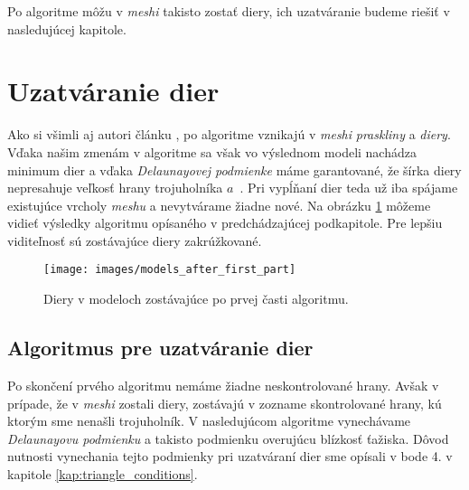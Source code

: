 \begin{enumerate}
    Po algoritme môžu v \textit{meshi} takisto zostať diery, ich uzatváranie budeme riešiť v nasledujúcej kapitole.
\end{enumerate}

\section{Uzatváranie dier}
\label{kap:second_part_of_algorithm}
Ako si všimli aj autori článku \cite{akkouche2001adaptive}, po algoritme vznikajú v \textit{meshi} 
\textit{praskliny} a \textit{diery}. Vďaka našim zmenám v algoritme sa však vo výslednom modeli nachádza minimum dier 
a vďaka \textit{Delaunayovej podmienke} máme garantované, že šírka diery nepresahuje veľkosť hrany trojuholníka
$a$~\cite{akkouche2001adaptive}. Pri vypĺňaní dier teda už iba spájame existujúce vrcholy \textit{meshu} a nevytvárame žiadne nové.
Na obrázku \ref{obr:models_after_first_part} môžeme vidieť výsledky algoritmu opísaného v 
predchádzajúcej podkapitole. Pre lepšiu viditeľnosť sú zostávajúce diery zakrúžkované.

\begin{figure}
    \centerline{\texttt{[image: images/models\_after\_first\_part]}}
    \caption[Diery v modeloch]
    {Diery v modeloch zostávajúce po prvej časti algoritmu.}
    \label{obr:models_after_first_part}
\end{figure}

\subsection{Algoritmus pre uzatváranie dier}

Po skončení prvého algoritmu nemáme žiadne neskontrolované hrany. Avšak v prípade, že v \textit{meshi} zostali 
diery, zostávajú v zozname skontrolované hrany, kú ktorým sme nenašli trojuholník. V nasledujúcom 
algoritme vynechávame \textit{Delaunayovu podmienku} a takisto podmienku overujúcu blízkosť ťažiska. 
Dôvod nutnosti vynechania tejto podmienky pri uzatváraní dier sme opísali v bode 4. v kapitole 
\ref{kap:triangle_conditions}.

